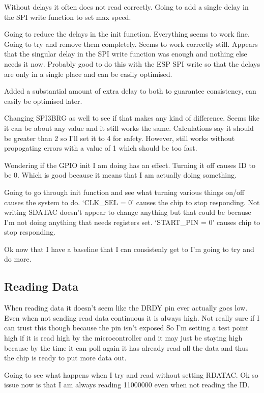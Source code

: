 Without delays it often does not read correctly.
Going to add a single delay in the SPI write function to set max speed.

Going to reduce the delays in the init function. Everything seems to work fine.
Going to try and remove them completely. Seems to work correctly still.
Appears that the singular delay in the SPI write function was enough and nothing else
needs it now. Probably good to do this with the ESP SPI write so that the delays are
only in a single place and can be easily optimised.

Added a substantial amount of extra delay to both to guarantee consistency, can easily
be optimised later.

Changing SPI3BRG as well to see if that makes any kind of difference.
Seems like it can be about any value and it still works the same.
Calculations say it should be greater than 2 so I'll set it to 4 for safety.
However, still works without propogating errors with a value of 1 which
should be too fast.

Wondering if the GPIO init I am doing has an effect. Turning it off causes ID to be 0.
Which is good because it means that I am actually doing something.

Going to go through init function and see what turning various things on/off
causes the system to do.
`CLK\_SEL = 0' causes the chip to stop responding.
Not writing SDATAC doesn't appear to change anything but that could be because I'm not
doing anything that needs registers set.
`START\_PIN = 0' causes chip to stop responding.

Ok now that I have a baseline that I can consistenly get to I'm going to try and do more.


\subsection{Reading Data}
When reading data it doesn't seem like the DRDY pin ever actually goes low.
Even when not sending read data continuous it is always high.
Not really sure if I can trust this though because the pin isn't exposed
So I'm setting a test point high if it is read high by the microcontroller and it may
just be staying high because by the time it can poll again it has already read all the data
and thus the chip is ready to put more data out.

Going to see what happens when I try and read without setting RDATAC.
Ok so issue now is that I am always reading 11000000 even when not reading the ID.

